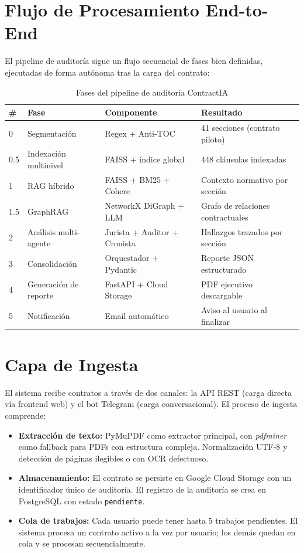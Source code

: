 \section{Flujo de Procesamiento End-to-End}

El pipeline de auditoría sigue un flujo secuencial de fases bien definidas,
ejecutadas de forma autónoma tras la carga del contrato:

\begin{table}[H]
\centering
\caption{Fases del pipeline de auditoría ContractIA}
\label{tab:pipeline}
\begin{tabular}{p{0.5cm} p{3.5cm} p{4.5cm} p{5cm}}
\toprule
\textbf{\#} & \textbf{Fase} & \textbf{Componente} & \textbf{Resultado} \\
\midrule
0 & Segmentación & Regex + Anti-TOC & 41 secciones (contrato piloto) \\[3pt]
0.5 & Indexación multinivel & FAISS + índice global & 448 cláusulas indexadas \\[3pt]
1 & RAG híbrido & FAISS + BM25 + Cohere & Contexto normativo por sección \\[3pt]
1.5 & GraphRAG & NetworkX DiGraph + LLM & Grafo de relaciones contractuales \\[3pt]
2 & Análisis multi-agente & Jurista + Auditor + Cronista & Hallazgos trazados por sección \\[3pt]
3 & Consolidación & Orquestador + Pydantic & Reporte JSON estructurado \\[3pt]
4 & Generación de reporte & FastAPI + Cloud Storage & PDF ejecutivo descargable \\[3pt]
5 & Notificación & Email automático & Aviso al usuario al finalizar \\
\bottomrule
\end{tabular}
\end{table}

\section{Capa de Ingesta}

El sistema recibe contratos a través de dos canales: la API REST (carga
directa vía frontend web) y el bot Telegram (carga conversacional). El
proceso de ingesta comprende:

\begin{itemize}
    \item \textbf{Extracción de texto:} PyMuPDF como extractor principal,
    con \textit{pdfminer} como fallback para PDFs con estructura compleja.
    Normalización UTF-8 y detección de páginas ilegibles o con OCR defectuoso.
    \item \textbf{Almacenamiento:} El contrato se persiste en Google Cloud
    Storage con un identificador único de auditoría. El registro de la
    auditoría se crea en PostgreSQL con estado \texttt{pendiente}.
    \item \textbf{Cola de trabajos:} Cada usuario puede tener hasta 5 trabajos
    pendientes. El sistema procesa un contrato activo a la vez por usuario;
    los demás quedan en cola y se procesan secuencialmente.
\end{itemize}

